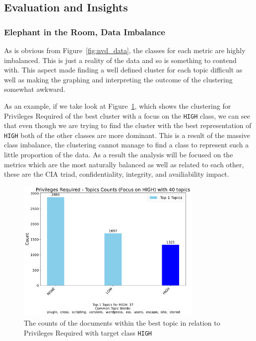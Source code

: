 \documentclass[12pt]{article}
\begin{document}
\subsection{Evaluation and Insights}

\subsubsection*{Elephant in the Room, Data Imbalance}

As is obvious from Figure~\ref{fig:nvd_data}, the classes for each metric are highly imbalanced.
This is just a reality of the data and so is something to contend with. This aspect
made finding a well defined cluster for each topic difficult as well as making the graphing and
interpreting the outcome of the clustering somewhat awkward.

As an example, if we take look at Figure~\ref{fig:priviledgesRequired_BAD}, which shows the
clustering for Privileges Required  of the best cluster with a focus on the \texttt{HIGH} class, we
can see that even though we are trying to find the cluster with the best representation of
\texttt{HIGH} both of the other classes are more dominant. This is a result of the massive class
imbalance, the clustering cannot manage to find a class to represent such a little proportion of the
data. As a result the analysis will be focused on the metrics which are the most naturally balanced
as well as related to each other, these are the CIA triad, confidentiality, integrity, and availiability
impact.

\begin{figure}[ht]
	\centering
	\includegraphics[width=0.8\textwidth]{figures/privilegesRequired/merged_top_k_topics_category_focus_counts_privilegesRequired_HIGH_k1.pdf}

	\caption{The counts of the documents within the best topic in relation to Privileges Required with
		target class \texttt{HIGH}}

	\label{fig:priviledgesRequired_BAD}
\end{figure}
\end{document}
